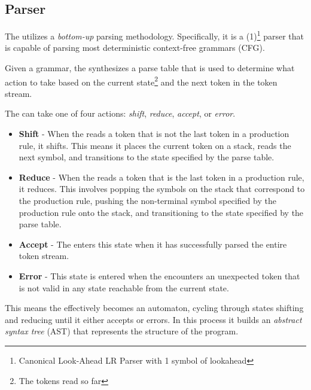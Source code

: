 \subsection{Parser}

The \lang{} \parser{} utilizes a \textit{bottom-up} parsing methodology.
Specifically, it is a \parserType{}(1)\footnote{Canonical Look-Ahead LR Parser with 1
symbol of lookahead} parser that is capable of parsing most deterministic
context-free grammars (CFG).

Given a grammar, the \parser{} synthesizes a parse table that is used to
determine what action to take based on the current state\footnote{The tokens
read so far} and the next token in the token stream. 

The \parser{} can take one of four actions: \textit{shift}, \textit{reduce},
\textit{accept}, or \textit{error}. 

\begin{itemize} 
  
  \item \textbf{Shift} - When the \parser{} reads a token that is not the last token
    in a production rule, it shifts. This means it places the current token on a
    stack, reads the next symbol, and transitions to the state specified by the parse
    table.

  \item \textbf{Reduce} - When the \parser{} reads a token that is the last token in
    a production rule, it reduces. This involves popping the symbols on the stack
    that correspond to the production rule, pushing the non-terminal symbol specified
    by the production rule onto the stack, and transitioning to the state specified
    by the parse table.

  \item \textbf{Accept} - The \parser{} enters this state when it has successfully
    parsed the entire token stream.

  \item \textbf{Error} - This state is entered when the \parser{} encounters an
    unexpected token that is not valid in any state reachable from the current state.

\end{itemize}

This means the \parser{} effectively becomes an automaton, cycling through states
shifting and reducing until it either accepts or errors. In this process it builds an
\textit{abstract syntax tree} (AST) that represents the structure of the program.

